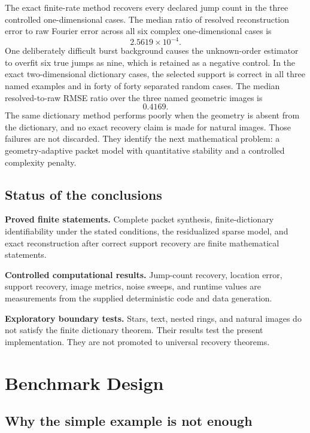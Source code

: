 \documentclass[11pt,oneside,openany]{book}
\theoremstyle{definition}
\theoremstyle{remark}
\newcommand{\Callout}[2][PaleBlue]{\noindent\colorbox{#1}{\parbox{0.965\linewidth}{\vspace{4pt}\RaggedRight #2\par\vspace{4pt}}}}
\begin{document}
The exact finite-rate method recovers every declared jump count in the three controlled one-dimensional cases. The median ratio of resolved reconstruction error to raw Fourier error across all six complex one-dimensional cases is
\[
2.5619\times10^{-4}.
\]
One deliberately difficult burst background causes the unknown-order estimator to overfit six true jumps as nine, which is retained as a negative control. In the exact two-dimensional dictionary cases, the selected support is correct in all three named examples and in forty of forty separated random cases. The median resolved-to-raw RMSE ratio over the three named geometric images is
\[
0.4169.
\]
The same dictionary method performs poorly when the geometry is absent from the dictionary, and no exact recovery claim is made for natural images. Those failures are not discarded. They identify the next mathematical problem: a geometry-adaptive packet model with quantitative stability and a controlled complexity penalty.

\chapter*{Status of the conclusions}
\Callout[PaleTeal]{\textbf{Proved finite statements.} Complete packet synthesis, finite-dictionary identifiability under the stated conditions, the residualized sparse model, and exact reconstruction after correct support recovery are finite mathematical statements.}

\Callout[PaleOrange]{\textbf{Controlled computational results.} Jump-count recovery, location error, support recovery, image metrics, noise sweeps, and runtime values are measurements from the supplied deterministic code and data generation.}

\Callout[PaleRed]{\textbf{Exploratory boundary tests.} Stars, text, nested rings, and natural images do not satisfy the finite dictionary theorem. Their results test the present implementation. They are not promoted to universal recovery theorems.}

\tableofcontents
\listoffigures

\mainmatter

\part{Benchmark Design}

\chapter{Why the simple example is not enough}
\end{document}
